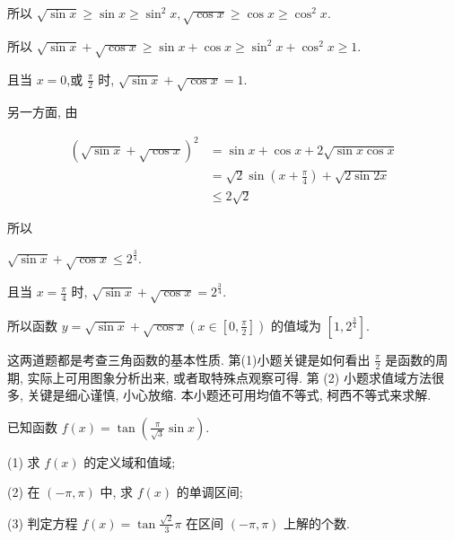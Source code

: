 \begin{solution}
	所以 $\sqrt{\sin x} \geqslant \sin x \geqslant \sin ^{2} x, \sqrt{\cos x} \geqslant \cos x \geqslant \cos ^{2} x$.

	所以 $\sqrt{\sin x}+\sqrt{\cos x} \geqslant \sin x+\cos x \geqslant \sin ^{2} x+\cos ^{2} x \geqslant 1$.

	且当 $x=0$,或 $\frac{\pi}{2}$ 时, $\sqrt{\sin x}+\sqrt{\cos x}=1$.

	另一方面, 由

	$$
		\begin{aligned}
			(\sqrt{\sin x}+\sqrt{\cos x})^{2} & =\sin x+\cos x+2 \sqrt{\sin x \cos x}                         \\
			                                  & =\sqrt{2} \sin \left(x+\frac{\pi}{4}\right)+\sqrt{2 \sin 2 x} \\
			                                  & \leqslant 2 \sqrt{2}
		\end{aligned}
	$$

	所以

	$\sqrt{\sin x}+\sqrt{\cos x} \leqslant 2^{\frac{3}{4}}$.

	且当 $x=\frac{\pi}{4}$ 时, $\sqrt{\sin x}+\sqrt{\cos x}=2^{\frac{3}{4}}$.

	所以函数 $y=\sqrt{\sin x}+\sqrt{\cos x}\left(x \in\left[0, \frac{\pi}{2}\right]\right)$ 的值域为 $\left[1,2^{\frac{3}{4}}\right]$.
\end{solution}

\begin{note}
	这两道题都是考查三角函数的基本性质. 第(1)小题关键是如何看出 $\frac{\pi}{2}$ 是函数的周期, 实际上可用图象分析出来, 或者取特殊点观察可得. 第 (2) 小题求值域方法很多, 关键是细心谨慎, 小心放缩. 本小题还可用均值不等式, 柯西不等式来求解.\\
\end{note}

\begin{example}
	已知函数 $f(x)=\tan \left(\frac{\pi}{\sqrt{3}} \sin x\right)$.

	(1) 求 $f(x)$ 的定义域和值域;

	(2) 在 $(-\pi, \pi)$ 中, 求 $f(x)$ 的单调区间;

	(3) 判定方程 $f(x)=\tan \frac{\sqrt{2}}{3} \pi$ 在区间 $(-\pi, \pi)$ 上解的个数.
\end{example}

